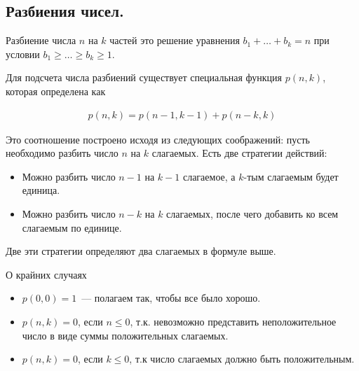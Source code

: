 \subsection{%
  Разбиения чисел.%
}

\begin{definition}
  Разбиение числа \(n\) на \(k\) частей это решение уравнения
  \(b_{1} + \dotsc + b_{k} = n\) при условии
  \(b_{1} \ge \dots \ge b_{k} \ge 1\).
\end{definition}

Для подсчета числа разбиений существует специальная функция \(p(n, k)\), которая
определена как

\begin{align*}
  p(n, k) = p(n - 1, k - 1) + p(n - k, k)
\end{align*}

Это соотношение построено исходя из следующих соображений: пусть необходимо
разбить число \(n\) на \(k\) слагаемых. Есть две стратегии действий:

\begin{itemize}
  \item Можно разбить число \(n - 1\) на \(k - 1\) слагаемое, а \(k\)-тым
  слагаемым будет единица.

  \item Можно разбить число \(n - k\) на \(k\) слагаемых, после чего добавить ко
  всем слагаемым по единице.
\end{itemize}

Две эти стратегии определяют два слагаемых в формуле выше.

\begin{remark}
  О крайних случаях

  \begin{itemize}
    \item \(p(0, 0) = 1\)~--- полагаем так, чтобы все было хорошо.
    
    \item \(p(n, k) = 0\), если \(n \le 0\), т.к. невозможно представить
    неположительное число в виде суммы положительных слагаемых.

    \item \(p(n, k) = 0\), если \(k \le 0\), т.к число слагаемых должно быть
    положительным.
  \end{itemize}
\end{remark}
